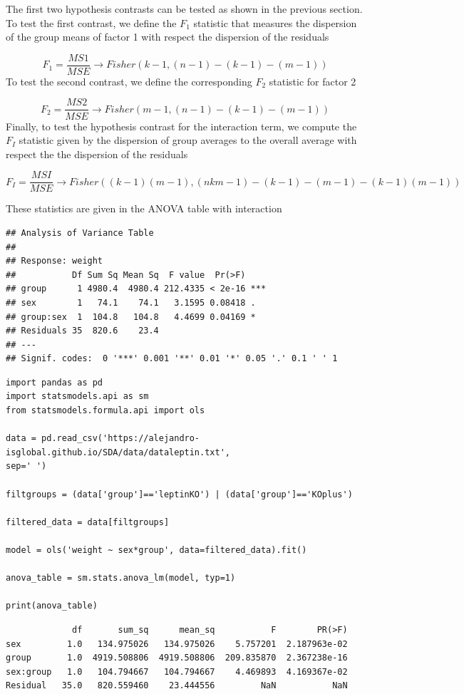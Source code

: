\documentclass[
]{book}
\begin{document}
The first two hypothesis contrasts can be tested as shown in the previous section. To test the first contrast, we define the \(F_1\) statistic that measures the dispersion of the group means of factor 1 with respect the dispersion of the residuals

\[F_1=\frac{MS1}{MSE} \rightarrow Fisher(k-1,(n-1)-(k-1)-(m-1))\]
To test the second contrast, we define the corresponding \(F_2\) statistic for factor 2

\[F_2=\frac{MS2}{MSE} \rightarrow Fisher(m-1,(n-1)-(k-1)-(m-1))\]
Finally, to test the hypothesis contrast for the interaction term, we compute the \(F_I\) statistic given by the dispersion of group averages to the overall average with respect the the dispersion of the residuals

\[F_I=\frac{MSI}{MSE}\rightarrow Fisher((k-1)(m-1),(nkm-1) -(k-1)-(m-1)-(k-1)(m-1))\]

These statistics are given in the ANOVA table with interaction

\begin{verbatim}
## Analysis of Variance Table
## 
## Response: weight
##           Df Sum Sq Mean Sq  F value  Pr(>F)    
## group      1 4980.4  4980.4 212.4335 < 2e-16 ***
## sex        1   74.1    74.1   3.1595 0.08418 .  
## group:sex  1  104.8   104.8   4.4699 0.04169 *  
## Residuals 35  820.6    23.4                     
## ---
## Signif. codes:  0 '***' 0.001 '**' 0.01 '*' 0.05 '.' 0.1 ' ' 1
\end{verbatim}

\begin{verbatim}
import pandas as pd
import statsmodels.api as sm
from statsmodels.formula.api import ols

data = pd.read_csv('https://alejandro-isglobal.github.io/SDA/data/dataleptin.txt', 
sep=' ')

filtgroups = (data['group']=='leptinKO') | (data['group']=='KOplus')

filtered_data = data[filtgroups]

model = ols('weight ~ sex*group', data=filtered_data).fit()

anova_table = sm.stats.anova_lm(model, typ=1)

print(anova_table)
\end{verbatim}

\begin{verbatim}
             df       sum_sq      mean_sq           F        PR(>F)
sex         1.0   134.975026   134.975026    5.757201  2.187963e-02
group       1.0  4919.508806  4919.508806  209.835870  2.367238e-16
sex:group   1.0   104.794667   104.794667    4.469893  4.169367e-02
Residual   35.0   820.559460    23.444556         NaN           NaN
\end{verbatim}
\end{document}
